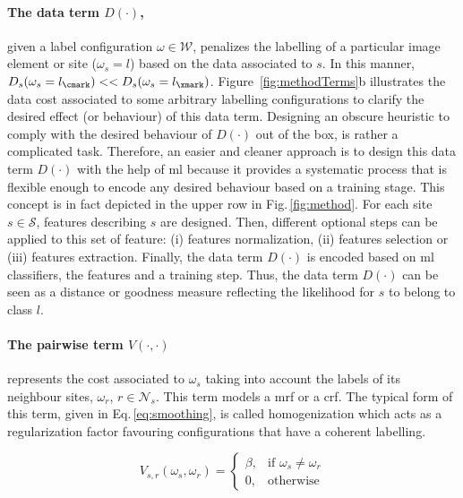\paragraph{The data term $D(\cdot)$,} \label{sec:method:dataTerm}
given a label configuration $\omega \in \mathcal{W}$, penalizes the labelling of a particular image element or site ($\omega_s = l$) based on the data associated to $s$.
In this manner, $D_s(\omega_s=l_\cmark) << D_s(\omega_s=l_\xmark)$.
Figure~\ref{fig:methodTerms}b illustrates the data cost associated to some arbitrary labelling configurations to clarify the desired effect (or behaviour) of this data term.
Designing an obscure heuristic to comply with the desired behaviour of $D(\cdot)$ out of the box, is rather a complicated task.
Therefore, an easier and cleaner approach is to design this data term $D(\cdot)$ with the help of \ac{ml} because it provides a systematic process that is flexible enough to encode any desired behaviour based on a training stage.
This concept is in fact depicted in the upper row in Fig.\,\ref{fig:method}.
For each site $s \in \mathcal{S}$, features describing $s$ are designed. Then, different optional steps can be applied to this set of feature: (i) features normalization, (ii) features selection or (iii) features extraction. Finally, the data term $D(\cdot)$ is encoded based on \ac{ml} classifiers, the features and a training step.
Thus, the data term $D(\cdot)$ can be seen as a distance or goodness measure reflecting the likelihood for $s$ to belong to class $l$.

\paragraph{The pairwise term $V(\cdot,\cdot)$} \label{sec:method:mrfTerm}
represents the cost associated to $\omega_s$ taking into account the labels of its neighbour sites, $\omega_r$, $r \in \mathcal{N}_{s}$. 
This term models a \ac{mrf} or a \ac{crf}.
The typical form of this term, given in Eq.\,\eqref{eq:smoothing}, is called homogenization which acts as a regularization factor favouring configurations that have a coherent labelling.

\begin{equation}
V_{s,r}(\omega_s,\omega_r) = 
\begin{cases}
    \beta, & \text{if } \omega_s \ne \omega_r\\
    0,              & \text{otherwise}
\end{cases}
\label{eq:smoothing}
\end{equation}

